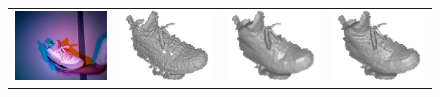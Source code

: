 \begin{figure}[!ht]
\centering
\setlength{\tabcolsep}{0.1em} %
 {\renewcommand{\arraystretch}{0.6}%
\begin{tabular}{c|c c c}
   \includegraphics[height = 0.19\linewidth]{figures/methodology/ratio_shoe_rgb.pdf} 
   &
   \includegraphics[height = 0.19\linewidth]{figures/methodology/ratio_shoe_shape_init.pdf} &
   \includegraphics[height = 0.19\linewidth]{figures/methodology/ratio_shoe_shape_smooth.pdf} &
   \includegraphics[height = 0.19\linewidth]{figures/methodology/ratio_shoe_shape.pdf} \\


\end{tabular}}
\end{figure}

